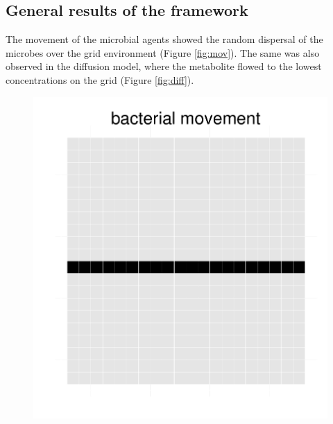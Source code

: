 \subsection{General results of the framework}
The movement of the microbial agents showed the random dispersal of the microbes over the grid environment (Figure \hyperref[fig:mov]{\ref{fig:mov}}). The same was also observed in the diffusion model, where the metabolite flowed to the lowest concentrations on the grid (Figure \hyperref[fig:diff]{\ref{fig:diff}}).

\begin{figure}[h!]
  \centering
  \begin{minipage}[t]{0.3\textwidth}
    \includegraphics[width=\textwidth]{mov1.pdf}
  \end{minipage}
  \begin{minipage}[t]{0.3\textwidth}

\end{minipage}
\end{figure}
